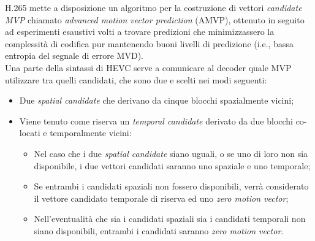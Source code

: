 H.265 mette a disposizione un algoritmo per la costruzione di vettori 
\emph{candidate MVP} chiamato \emph{advanced motion vector prediction} (AMVP), 
ottenuto in seguito ad esperimenti esaustivi volti a trovare predizioni che 
minimizzassero la complessità di codifica pur mantenendo buoni livelli di 
predizione (i.e., bassa entropia del segnale di errore MVD).\\
Una parte della sintassi di HEVC serve a comunicare al decoder quale MVP 
utilizzare tra quelli candidati, che sono due e scelti nei modi seguenti:
\begin{itemize}
\item Due \emph{spatial candidate} che derivano da cinque blocchi spazialmente 
vicini;
\item Viene tenuto come riserva un \emph{temporal candidate} derivato da due 
blocchi co-locati e temporalmente vicini:
\begin{itemize}
\item Nel caso che i due \emph{spatial candidate} siano uguali, o se uno di loro
 non sia disponibile, i due vettori candidati saranno uno spaziale e uno 
temporale;

\item Se entrambi i candidati spaziali non fossero disponibili, verrà 
considerato il vettore candidato temporale di riserva ed uno 
\emph{zero motion vector};

\item Nell'eventualità che sia i candidati spaziali sia i candidati temporali 
non siano disponibili, entrambi i candidati saranno \emph{zero motion vector}.
\end{itemize}
\end{itemize}

